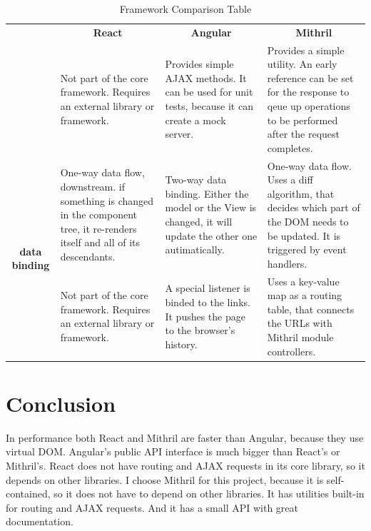 \begin{center}
	\begin{table}[!htbp]
		\begin{tabular}{|p{3cm}||p{3.5cm}|p{3.5cm}|p{3.5cm}|}\hline
									& \multicolumn{1}{c|}{\textbf{React}}          
									& \multicolumn{1}{c|}{\textbf{Angular}}   
									& \multicolumn{1}{c|}{\textbf{Mithril}} \tabularnewline \hhline{|=#=|=|=|}
		\multicolumn{1}{|c||}{\multirow{7}{*}{\textbf{AJAX requests}}}      
									& Not part of the core framework. Requires an external library or framework.          
									& Provides simple AJAX methods. It can be used for unit tests, because it can create a mock server.
									& Provides a simple utility. An early reference can be set for the response to qeue up operations to be performed after the request completes. \tabularnewline\hline
		\multicolumn{1}{|c||}{\multirow{7}{*}{\textbf{data binding}}} 		
									& One-way data flow, downstream. if something is changed in the component tree, it re-renders itself and all of its descendants.
									& Two-way data binding. Either the model or the View is changed, it will update the other one autimatically.    
									& One-way data flow. Uses a diff algorithm, that decides which part of the DOM needs to be updated. It is triggered by event handlers.   \tabularnewline\hline
		\multicolumn{1}{|c||}{\multirow{6}{*}{\textbf{routing}}}        	
									& Not part of the core framework. Requires an external library or framework.         
									& A special listener is binded to the links. It pushes the page to the browser's history.
									& Uses a key-value map as a routing table, that connects the URLs with Mithril module controllers.    \tabularnewline \hline
	\end{tabular}
	\caption{Framework Comparison Table}
	\label{table:frameworkcomparison}
	\end{table}
\end{center}


\section{Conclusion}
In performance both React and Mithril are faster than Angular, because they use virtual DOM. Angular's public API interface is much bigger than React's or Mithril's. React does not have routing and AJAX requests in its core library, so it depends on other libraries. 
I choose Mithril for this project, because it is  self-contained, so it does not have to depend on other libraries. It has utilities built-in for routing and AJAX requests. And it has a small API with great documentation. 

